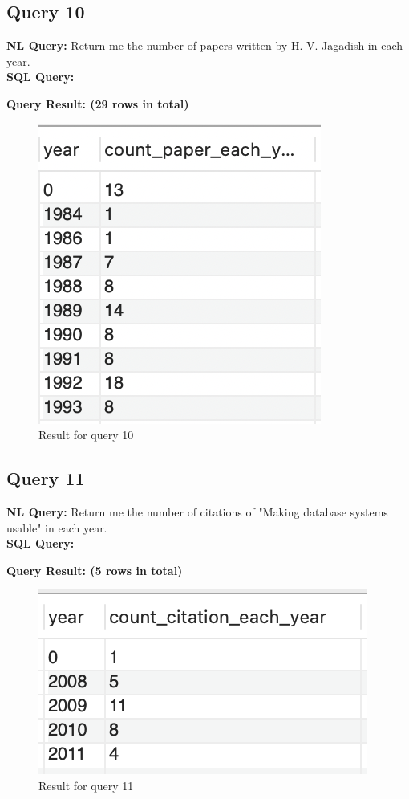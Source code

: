 \documentclass{article}
\begin{document}
\subsection{Query 10}
\textbf{NL Query:} Return me the number of papers written by H. V. Jagadish in each year.
\vspace{6 pt}
\\
\textbf{SQL Query:}

\textbf{Query Result: (29 rows in total)}
\begin{figure}[h]
	\centering
	\includegraphics[width=.13\textheight]{figures/q10_res.png}
	\caption{Result for query 10}
	\label{fig:011}
\end{figure}
\subsection{Query 11}
\textbf{NL Query:}  Return me the number of citations of "Making database systems usable" in each year.
\vspace{6 pt}
\\
\textbf{SQL Query:}

\textbf{Query Result: (5 rows in total)}
\begin{figure}[h]
	\centering
	\includegraphics[width=.15\textheight]{figures/q11_res.png}
	\caption{Result for query 11}
	\label{fig:012}
\end{figure}
\end{document}
